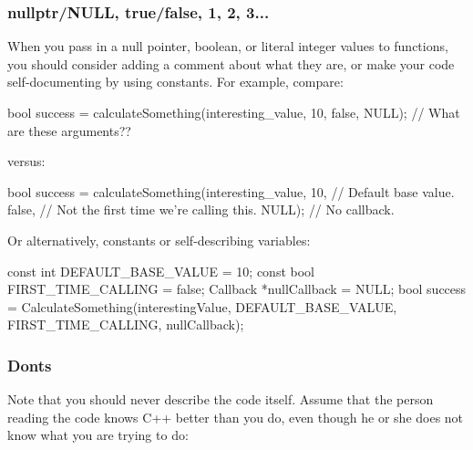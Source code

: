 \subsubsection*{nullptr/\+N\+U\+LL, true/false, 1, 2, 3...}

When you pass in a null pointer, boolean, or literal integer values to functions, you should consider adding a comment about what they are, or make your code self-\/documenting by using constants. For example, compare\+:


\begin{DoxyCode}
\textcolor{keywordtype}{bool} success = calculateSomething(interesting\_value,
                                  10,
                                  \textcolor{keyword}{false},
                                  NULL);  \textcolor{comment}{// What are these arguments??}
\end{DoxyCode}


versus\+:


\begin{DoxyCode}
\textcolor{keywordtype}{bool} success = calculateSomething(interesting\_value,
                                  10,     \textcolor{comment}{// Default base value.}
                                  \textcolor{keyword}{false},  \textcolor{comment}{// Not the first time we're calling this.}
                                  NULL);  \textcolor{comment}{// No callback.}
\end{DoxyCode}


Or alternatively, constants or self-\/describing variables\+:


\begin{DoxyCode}
\textcolor{keyword}{const} \textcolor{keywordtype}{int} DEFAULT\_BASE\_VALUE = 10;
\textcolor{keyword}{const} \textcolor{keywordtype}{bool} FIRST\_TIME\_CALLING = \textcolor{keyword}{false};
Callback *nullCallback = NULL;
\textcolor{keywordtype}{bool} success = CalculateSomething(interestingValue,
                                  DEFAULT\_BASE\_VALUE,
                                  FIRST\_TIME\_CALLING,
                                  nullCallback);
\end{DoxyCode}


\subsubsection*{Don\textquotesingle{}ts}

Note that you should never describe the code itself. Assume that the person reading the code knows C++ better than you do, even though he or she does not know what you are trying to do\+:


